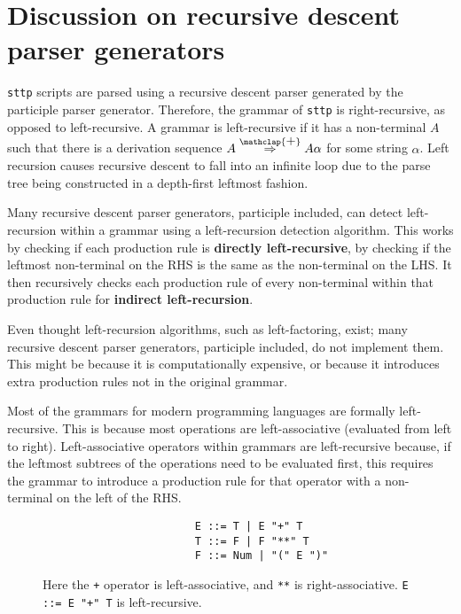 \chapter{Discussion on recursive descent parser generators}
\label{chap:discussion}

\verb|sttp| scripts are parsed using a recursive descent parser generated by the participle parser generator. Therefore, the grammar of \verb|sttp| is right-recursive, as opposed to left-recursive. A grammar is left-recursive if it has a non-terminal $A$ such that there is a derivation sequence $A \stackrel{\mathclap{\normalfont\mbox{+}}}{\Rightarrow} A \alpha$ for some string $\alpha$. Left recursion causes recursive descent to fall into an infinite loop due to the parse tree being constructed in a depth-first leftmost fashion\textsuperscript{\cite{scott_johnstone_1998}}.

Many recursive descent parser generators, participle included, can detect left-recursion within a grammar using a left-recursion detection algorithm. This works by checking if each production rule is \textbf{directly left-recursive}, by checking if the leftmost non-terminal on the RHS is the same as the non-terminal on the LHS. It then recursively checks each production rule of every non-terminal within that production rule for \textbf{indirect left-recursion}.

Even thought left-recursion algorithms, such as left-factoring, exist; many recursive descent parser generators, participle included, do not implement them. This might be because it is computationally expensive, or because it introduces extra production rules not in the original grammar.

Most of the grammars for modern programming languages are formally left-recursive. This is because most operations are left-associative (evaluated from left to right). Left-associative operators within grammars are left-recursive because, if the leftmost subtrees of the operations need to be evaluated first, this requires the grammar to introduce a production rule for that operator with a non-terminal on the left of the RHS.

\begin{figure}[H]
    \begin{center}
        \begin{verbatim}
                        E ::= T | E "+" T
                        T ::= F | F "**" T
                        F ::= Num | "(" E ")"
        \end{verbatim}
    \end{center}
    \vspace{-1.5em}
    \cprotect\caption{\label{fig:4.1}Here the \verb|+| operator is left-associative, and \verb|**| is right-associative. \verb|E ::= E "+" T| is left-recursive.}
\end{figure}

